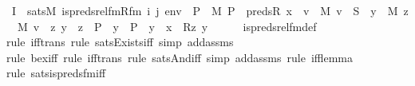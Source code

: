 \begin{isabellebody}
\ I{}\ {\isacharcolon}{\kern0pt}\ {\isachardoublequoteopen}sats{\isacharparenleft}{\kern0pt}M{\isacharcomma}{\kern0pt}\ is{\isacharunderscore}{\kern0pt}preds{\isacharunderscore}{\kern0pt}rel{\isacharunderscore}{\kern0pt}fm{\isacharparenleft}{\kern0pt}Rfm{\isacharcomma}{\kern0pt}\ i{\isacharcomma}{\kern0pt}\ j{\isacharparenright}{\kern0pt}{\isacharcomma}{\kern0pt}\ env{\isacharparenright}{\kern0pt}\ {\isasymlongleftrightarrow}\ {\isacharparenleft}{\kern0pt}{\isasymexists}P\ {\isasymin}\ M{\isachardot}{\kern0pt}\ P\ {\isacharequal}{\kern0pt}\ preds{\isacharparenleft}{\kern0pt}R{\isacharcomma}{\kern0pt}\ x{\isacharparenright}{\kern0pt}\ {\isasymand}\ {\isacharparenleft}{\kern0pt}{\isasymforall}v\ {\isasymin}\ M{\isachardot}{\kern0pt}\ v\ {\isasymin}\ S\ {\isasymlongleftrightarrow}\ {\isacharparenleft}{\kern0pt}{\isasymexists}y\ {\isasymin}\ M{\isachardot}{\kern0pt}\ {\isasymexists}z\ {\isasymin}\ M{\isachardot}{\kern0pt}\ v\ {\isacharequal}{\kern0pt}\ {\isacharless}{\kern0pt}z{\isacharcomma}{\kern0pt}\ y{\isachargreater}{\kern0pt}\ {\isasymand}\ z\ {\isasymin}\ P\ {\isasymand}\ {\isacharparenleft}{\kern0pt}y\ {\isasymin}\ P\ {\isasymor}\ y\ {\isacharequal}{\kern0pt}\ x{\isacharparenright}{\kern0pt}\ {\isasymand}\ R{\isacharparenleft}{\kern0pt}z{\isacharcomma}{\kern0pt}\ y{\isacharparenright}{\kern0pt}{\isacharparenright}{\kern0pt}{\isacharparenright}{\kern0pt}{\isacharparenright}{\kern0pt}{\isachardoublequoteclose}\isanewline
\ \ \ \ \isamarkupfalse%
\ is{\isacharunderscore}{\kern0pt}preds{\isacharunderscore}{\kern0pt}rel{\isacharunderscore}{\kern0pt}fm{\isacharunderscore}{\kern0pt}def\ \isanewline
\ \ \ \ \isamarkupfalse%
{\isacharparenleft}{\kern0pt}rule\ iff{\isacharunderscore}{\kern0pt}trans{\isacharcomma}{\kern0pt}\ rule\ sats{\isacharunderscore}{\kern0pt}Exists{\isacharunderscore}{\kern0pt}iff{\isacharcomma}{\kern0pt}\ simp\ add{\isacharcolon}{\kern0pt}assms{\isacharparenright}{\kern0pt}\isanewline
\ \ \ \ \isamarkupfalse%
{\isacharparenleft}{\kern0pt}rule\ bex{\isacharunderscore}{\kern0pt}iff{\isacharcomma}{\kern0pt}\ rule\ iff{\isacharunderscore}{\kern0pt}trans{\isacharcomma}{\kern0pt}\ rule\ sats{\isacharunderscore}{\kern0pt}And{\isacharunderscore}{\kern0pt}iff{\isacharcomma}{\kern0pt}\ simp\ add{\isacharcolon}{\kern0pt}assms{\isacharcomma}{\kern0pt}\ rule\ iff{\isacharunderscore}{\kern0pt}lemma{\isacharparenright}{\kern0pt}\isanewline
\ \ \ \ \isamarkupfalse%
{\isacharparenleft}{\kern0pt}rule\ sats{\isacharunderscore}{\kern0pt}is{\isacharunderscore}{\kern0pt}preds{\isacharunderscore}{\kern0pt}fm{\isacharunderscore}{\kern0pt}iff{\isacharparenright}{\kern0pt}\isanewline

\end{isabellebody}
